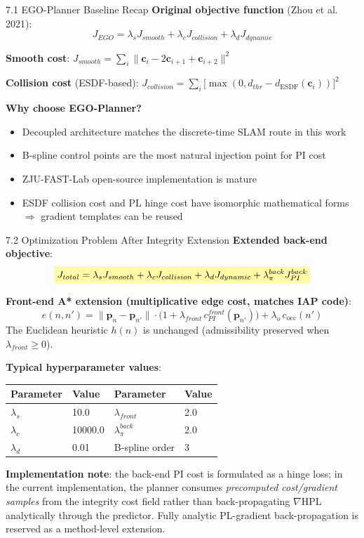\documentclass[10pt,aspectratio=169,xcolor=dvipsnames]{beamer}
\newcommand{\HPL}{\mathrm{HPL}}
\newcommand{\1}{\mathbb{1}}
\newcommand{\hlb}[1]{\colorbox{yellow!35}{\(\displaystyle #1\)}}
\begin{document}
\begin{frame}{7.1 EGO-Planner Baseline Recap}
  \small
  \textbf{Original objective function} (Zhou et al. 2021):
  \[
    J_{EGO}=\lambda_s J_{smooth}+\lambda_c J_{collision}+\lambda_d J_{dynamic}
  \]

  \textbf{Smooth cost}: $J_{smooth}=\sum_i\|\bm{c}_i-2\bm{c}_{i+1}+\bm{c}_{i+2}\|^2$

  \textbf{Collision cost} (ESDF-based): $J_{collision}=\sum_i\bigl[\max(0,d_{thr}-d_{\mathrm{ESDF}}(\bm{c}_i))\bigr]^2$

  \medskip
  \textbf{Why choose EGO-Planner?}
  \begin{itemize}\scriptsize
    \item Decoupled architecture matches the discrete-time SLAM route in this work
    \item B-spline control points are the most natural injection point for PI cost
    \item ZJU-FAST-Lab open-source implementation is mature
    \item ESDF collision cost and PL hinge cost have isomorphic mathematical forms $\Rightarrow$ gradient templates can be reused
  \end{itemize}
\end{frame}

\begin{frame}{7.2 Optimization Problem After Integrity Extension}
  \small
  \textbf{Extended back-end objective}:
  \[
    \hlb{
      J_{total}=\lambda_s J_{smooth}+\lambda_c J_{collision}+\lambda_d J_{dynamic}+\lambda_\pi^{back} J_{PI}^{back}
    }
  \]

  \medskip
  \textbf{Front-end A* extension (multiplicative edge cost, matches IAP code)}:
  \[
    e(n,n')=\|\bm{p}_n-\bm{p}_{n'}\|\cdot\bigl(1+\lambda_{front}\,c_{PI}^{front}(\bm{p}_{n'})\bigr)+\lambda_o\,c_{\mathrm{occ}}(n')
  \]
  The Euclidean heuristic $h(n)$ is unchanged (admissibility preserved when $\lambda_{front}\ge 0$).

  \medskip
  \textbf{Typical hyperparameter values}:
  \begin{table}\scriptsize
    \begin{tabular}{llll}
      \toprule
      Parameter & Value & Parameter & Value\\
      \midrule
      $\lambda_s$ & 10.0 & $\lambda_{front}$ & 2.0\\
      $\lambda_c$ & 10000.0 & $\lambda_\pi^{back}$ & 2.0\\
      $\lambda_d$ & 0.01 & B-spline order & 3\\
      \bottomrule
    \end{tabular}
  \end{table}

  \textbf{Implementation note}: the back-end PI cost is formulated as a hinge loss; in the current implementation, the planner consumes \emph{precomputed cost/gradient samples} from the integrity cost field rather than back-propagating $\nabla\HPL$ analytically through the predictor. Fully analytic PL-gradient back-propagation is reserved as a method-level extension.
\end{frame}
\end{document}
